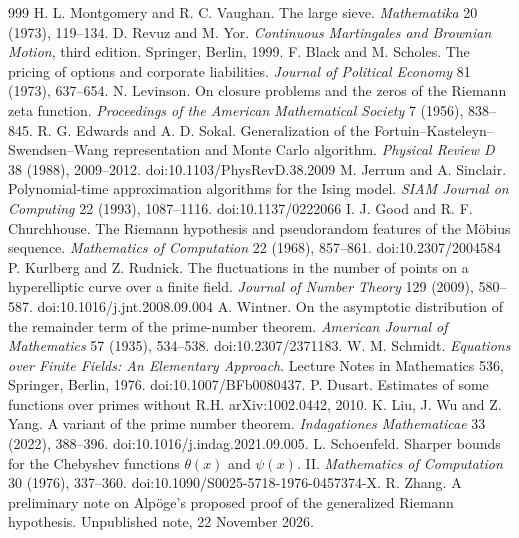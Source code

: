 \begin{thebibliography}{999}
 H. L. Montgomery and R. C. Vaughan. The large sieve. \emph{Mathematika} 20 (1973), 119--134.
 D. Revuz and M. Yor. \emph{Continuous Martingales and Brownian Motion}, third edition. Springer, Berlin, 1999.
 F. Black and M. Scholes. The pricing of options and corporate liabilities. \emph{Journal of Political Economy} 81 (1973), 637--654.
 N. Levinson. On closure problems and the zeros of the Riemann zeta function. \emph{Proceedings of the American Mathematical Society} 7 (1956), 838--845.
 R. G. Edwards and A. D. Sokal. Generalization of the Fortuin--Kasteleyn--Swendsen--Wang representation and Monte Carlo algorithm. \emph{Physical Review D} 38 (1988), 2009--2012. doi:10.1103/PhysRevD.38.2009 %
 M. Jerrum and A. Sinclair. Polynomial-time approximation algorithms for the Ising model. \emph{SIAM Journal on Computing} 22 (1993), 1087--1116. doi:10.1137/0222066 %
 I. J. Good and R. F. Churchhouse. The Riemann hypothesis and pseudorandom features of the M\"obius sequence. \emph{Mathematics of Computation} 22 (1968), 857--861. doi:10.2307/2004584 %
 P. Kurlberg and Z. Rudnick. The fluctuations in the number of points on a hyperelliptic curve over a finite field. \emph{Journal of Number Theory} 129 (2009), 580--587. doi:10.1016/j.jnt.2008.09.004 %
 A. Wintner. On the asymptotic distribution of the remainder term of the prime-number theorem. \emph{American Journal of Mathematics} 57 (1935), 534--538. doi:10.2307/2371183. %
 W. M. Schmidt. \emph{Equations over Finite Fields: An Elementary Approach}. Lecture Notes in Mathematics 536, Springer, Berlin, 1976. doi:10.1007/BFb0080437.
 P. Dusart. Estimates of some functions over primes without R.H. arXiv:1002.0442, 2010.
 K. Liu, J. Wu and Z. Yang. A variant of the prime number theorem. \emph{Indagationes Mathematicae} 33 (2022), 388--396. doi:10.1016/j.indag.2021.09.005.
 L. Schoenfeld. Sharper bounds for the Chebyshev functions $\theta(x)$ and $\psi(x)$. II. \emph{Mathematics of Computation} 30 (1976), 337--360. doi:10.1090/S0025-5718-1976-0457374-X.
 R. Zhang. A preliminary note on Alp\"oge's proposed proof of the generalized Riemann hypothesis. Unpublished note, 22 November 2026.
\end{thebibliography}
